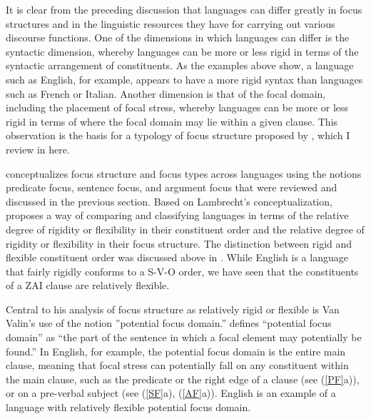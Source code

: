 It is clear from the preceding discussion that languages can differ greatly in focus structures and in the linguistic resources they have for carrying out various discourse functions. One of the dimensions in which languages can differ is the syntactic dimension, whereby languages can be more or less rigid in terms of the syntactic arrangement of constituents. As the examples above show, a language such as English, for example, appears to have a more rigid syntax than languages such as French or Italian. Another dimension is that of the focal domain, including the placement of focal stress, whereby languages can be more or less rigid in terms of where the focal domain may lie within a given clause. This observation is the basis for a typology of focus structure proposed by \citet{vanvalin1999}, which I review in here. 

\citet{lambrecht1994} conceptualizes focus structure and focus types across languages using the notions predicate focus, sentence focus, and argument focus that were reviewed and discussed in the previous section. Based on Lambrecht's conceptualization, \citet{vanvalin1999} proposes a way of comparing and classifying languages in terms of the relative degree of rigidity or flexibility in their constituent order and the relative degree of rigidity or flexibility in their focus structure. The distinction between rigid and flexible constituent order was discussed above in . While English is a language that fairly rigidly conforms to a S-V-O order, we have seen that the constituents of a ZAI clause are relatively flexible.

Central to his analysis of focus structure as relatively rigid or flexible is Van Valin's use of the notion ''potential focus domain.'' \citet[513]{vanvalin1999} defines ``potential focus domain'' as ``the part of the sentence in which a focal element may potentially be found.'' In English, for example, the potential focus domain is the entire main clause, meaning that focal stress can potentially fall on any constituent within the main clause, such as the predicate or the right edge of a clause (see (\ref{PF}a)), or on a pre-verbal subject (see (\ref{SF}a), (\ref{AF}a)). English is an example of a language with relatively flexible potential focus domain. 

